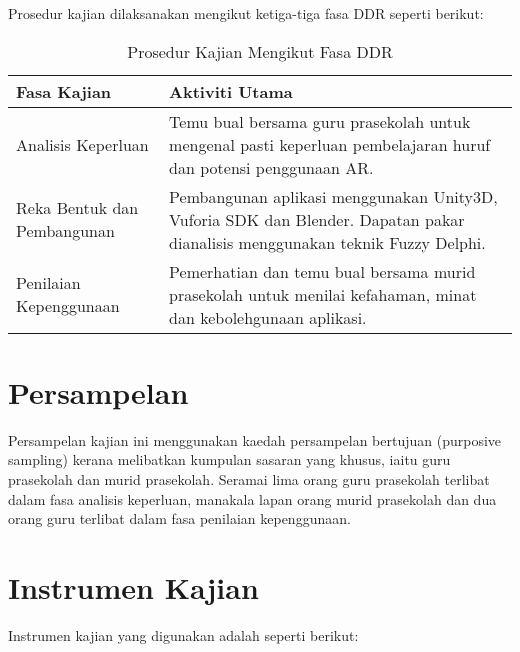 Prosedur kajian dilaksanakan mengikut ketiga-tiga fasa DDR seperti berikut:

\begin{table}[H]
\centering
\caption{Prosedur Kajian Mengikut Fasa DDR}
\label{jadual:prosedurDDR}
\begin{tabular}{|p{3cm}|p{10cm}|}
\hline
\textbf{Fasa Kajian} & \textbf{Aktiviti Utama} \\
\hline
Analisis Keperluan & Temu bual bersama guru prasekolah untuk mengenal pasti keperluan pembelajaran huruf dan potensi penggunaan AR. \\
\hline
Reka Bentuk dan Pembangunan & Pembangunan aplikasi menggunakan Unity3D, Vuforia SDK dan Blender. Dapatan pakar dianalisis menggunakan teknik Fuzzy Delphi. \\
\hline
Penilaian Kepenggunaan & Pemerhatian dan temu bual bersama murid prasekolah untuk menilai kefahaman, minat dan kebolehgunaan aplikasi. \\
\hline
\end{tabular}
\end{table}

\section{Persampelan}

Persampelan kajian ini menggunakan kaedah persampelan bertujuan (purposive sampling) kerana melibatkan kumpulan sasaran yang khusus, iaitu guru prasekolah dan murid prasekolah. Seramai lima orang guru prasekolah terlibat dalam fasa analisis keperluan, manakala lapan orang murid prasekolah dan dua orang guru terlibat dalam fasa penilaian kepenggunaan.

\section{Instrumen Kajian}

Instrumen kajian yang digunakan adalah seperti berikut:

